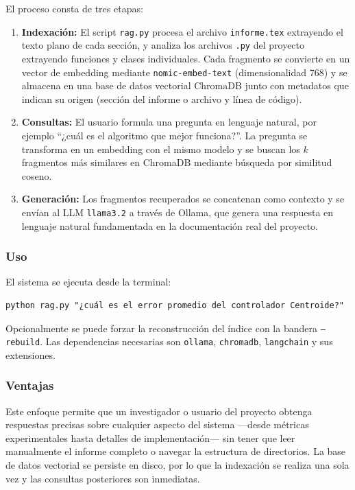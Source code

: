 \documentclass[conference]{IEEEtran}
\begin{document}
El proceso consta de tres etapas:

\begin{enumerate}
    \item \textbf{Indexación:} El script \texttt{rag.py} procesa el archivo \texttt{informe.tex} extrayendo el texto plano de cada sección, y analiza los archivos \texttt{.py} del proyecto extrayendo funciones y clases individuales. Cada fragmento se convierte en un vector de embedding mediante \texttt{nomic-embed-text} (dimensionalidad 768) y se almacena en una base de datos vectorial ChromaDB junto con metadatos que indican su origen (sección del informe o archivo y línea de código).
    
    \item \textbf{Consultas:} El usuario formula una pregunta en lenguaje natural, por ejemplo ``¿cuál es el algoritmo que mejor funciona?''. La pregunta se transforma en un embedding con el mismo modelo y se buscan los $k$ fragmentos más similares en ChromaDB mediante búsqueda por similitud coseno.
    
    \item \textbf{Generación:} Los fragmentos recuperados se concatenan como contexto y se envían al LLM \texttt{llama3.2} a través de Ollama, que genera una respuesta en lenguaje natural fundamentada en la documentación real del proyecto.
\end{enumerate}

\subsubsection{Uso}

El sistema se ejecuta desde la terminal:

\begin{lstlisting}[style=pythonstyle]
python rag.py "¿cuál es el error promedio del controlador Centroide?"
\end{lstlisting}

Opcionalmente se puede forzar la reconstrucción del índice con la bandera \texttt{--rebuild}. Las dependencias necesarias son \texttt{ollama}, \texttt{chromadb}, \texttt{langchain} y sus extensiones.

\subsubsection{Ventajas}

Este enfoque permite que un investigador o usuario del proyecto obtenga respuestas precisas sobre cualquier aspecto del sistema —desde métricas experimentales hasta detalles de implementación— sin tener que leer manualmente el informe completo o navegar la estructura de directorios. La base de datos vectorial se persiste en disco, por lo que la indexación se realiza una sola vez y las consultas posteriores son inmediatas.
\end{document}
